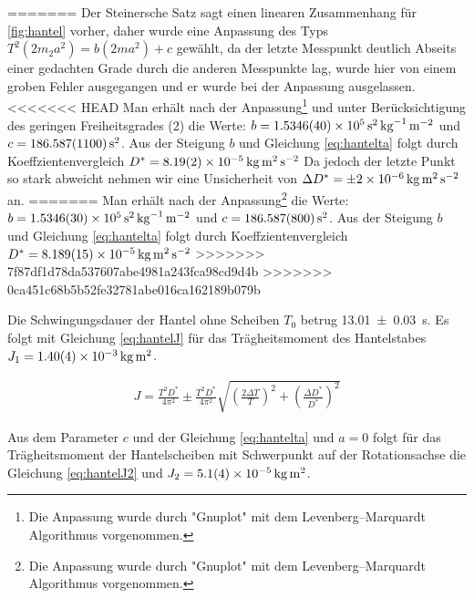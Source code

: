 =======
Der Steinersche Satz sagt einen linearen Zusammenhang für \cref{fig:hantel} vorher, daher wurde eine Anpassung des Typs $T^2(2m_2 a^2)=b (2m a^2)+c$ gewählt, da der letzte Messpunkt deutlich Abseits einer gedachten Grade durch die anderen Messpunkte lag, wurde hier von einem groben Fehler ausgegangen und er wurde bei der Anpassung ausgelassen.
<<<<<<< HEAD
Man erhält nach der Anpassung\footnote{Die Anpassung wurde durch "Gnuplot" mit dem Levenberg–Marquardt Algorithmus vorgenommen.  } und unter Berücksichtigung des geringen Freiheitsgrades (2) die Werte:
 $ b               = \SI{1.5346 \pm 0.004 e+005}{\second \squared \per \kilogram \per \metre \squared} $ und $c               = \SI{186.587\pm 1.1}   {\second \squared}$. Aus der Steigung $b$ und Gleichung \ref{eq:hantelta} folgt durch Koeffzientenvergleich $D^*=\SI{8.19+-0.02e-5}{\kilogram \metre \squared \per \second \squared }$ Da jedoch der letzte Punkt so stark abweicht nehmen wir eine Unsicherheit von $\Delta D^*= \SI{\pm 2e-6}{\kilogram \metre \squared \per \second \squared }$ an.
=======
Man erhält nach der Anpassung\footnote{Die Anpassung wurde durch "Gnuplot" mit dem Levenberg–Marquardt Algorithmus vorgenommen.  } die Werte:
 $ b               = \SI{1.5346 \pm 0.003 e+005}{\second \squared \per \kilogram \per \metre \squared} $ und $c               = \SI{186.587\pm 0.8 }   {\second \squared}$. Aus der Steigung $b$ und Gleichung \ref{eq:hantelta} folgt durch Koeffzientenvergleich $D^*=\SI{8.189+-0.015e-5}{\kilogram \metre \squared \per \second \squared }$
>>>>>>> 7f87df1d78da537607abe4981a243fca98cd9d4b
>>>>>>> 0ca451c68b5b52fe32781abe016ca162189b079b







Die Schwingungsdauer der Hantel ohne Scheiben $T_0$  betrug \SI{13.01 \pm 0.03}{s}. Es folgt mit Gleichung \ref{eq:hantelJ} für das Trägheitsmoment des Hantelstabes $J_1 = \SI{1.40+-0.04e-3}{\kilogram \metre \squared}$.



\begin{align}
	J=\frac{T^2 D^*}{4 \pi^2} \pm \frac{T^2 D^*}{4 \pi^2} \sqrt{
	\left(\frac{2 \Delta T}{T} \right)^2 + 	\left(\frac{\Delta D^*}{D^*} \right)^2 }
\label{eq:hantelJ}
\end{align}




Aus dem Parameter $c$ und der Gleichung \ref{eq:hantelta} und $a=0$  folgt für das Trägheitsmoment der Hantelscheiben mit Schwerpunkt auf der Rotationsachse die Gleichung \ref{eq:hantelJ2} und $J_2=\SI{5.1+-0.4e-5 }{\kilogram \metre \squared}$.


